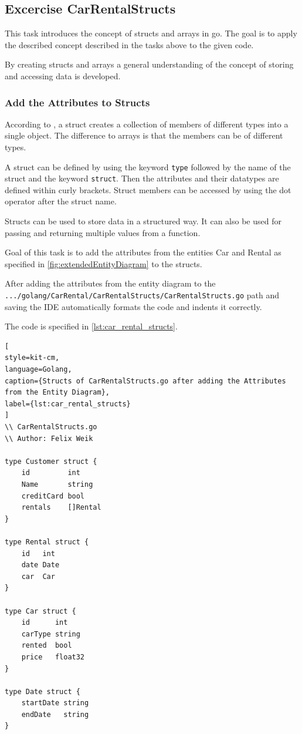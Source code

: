 \subsection{Excercise CarRentalStructs}
\label{sec:car_rental_structs}
This task introduces the concept of structs and arrays in go.
The goal is to apply the described concept described in the tasks above to the given code.

By creating structs and arrays a general understanding of the concept of storing and accessing data is developed.

\subsubsection*{Add the Attributes to Structs}
According to \cite{W3-GOSTRUCT}, a struct creates a collection of members of different types into a single object.
The difference to arrays is that the members can be of different types.

A struct can be defined by using the keyword \texttt{type} followed by the name of the struct and the keyword \texttt{struct}.
Then the attributes and their datatypes are defined within curly brackets.
Struct members can be accessed by using the dot operator after the struct name.

Structs can be used to store data in a structured way.
It can also be used for passing and returning multiple values from a function.

Goal of this task is to add the attributes from the entities Car and Rental as specified in \autoref{fig:extendedEntityDiagram} to the structs.

After adding the attributes from the entity diagram to the \hfill \newline \texttt{.../golang/CarRental/CarRentalStructs/CarRentalStructs.go} path and saving
the IDE automatically formats the code and indents it correctly.

The code is specified in \autoref{lst:car_rental_structs}.
\begin{lstlisting}[
style=kit-cm,
language=Golang,
caption={Structs of CarRentalStructs.go after adding the Attributes from the Entity Diagram},
label={lst:car_rental_structs}
]
\\ CarRentalStructs.go
\\ Author: Felix Weik

type Customer struct {
	id         int
	Name       string
	creditCard bool
	rentals    []Rental
}

type Rental struct {
	id   int
	date Date
	car  Car
}

type Car struct {
	id      int
	carType string
	rented  bool
	price   float32
}

type Date struct {
	startDate string
	endDate   string
}
\end{lstlisting}

